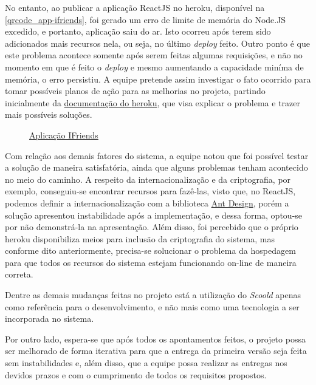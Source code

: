  No entanto, ao publicar a aplicação ReactJS no \gls{heroku}, disponível na \autoref{qrcode_app-ifriends}, foi gerado um erro de limite de memória do Node.JS excedido, e portanto, aplicação saiu do ar. Isto ocorreu após terem sido adicionados mais recursos nela, ou seja, no último \textsl{deploy} feito. Outro ponto é que este problema acontece somente após serem feitas algumas requisições, e não no momento em que é feito o \textsl{deploy} e mesmo aumentando a capacidade miníma de memória, o erro persistiu. A equipe pretende assim investigar o fato ocorrido para tomar possíveis planos de ação para as melhorias no projeto, partindo inicialmente da \href{https://devcenter.heroku.com/articles/node-memory-use}{documentação do \gls{heroku}}, que visa explicar o problema e trazer mais possíveis soluções.
 
\begin{figure}[htb]
\centering
\caption{\href{https://app-ifriends.herokuapp.com}{Aplicação IFriends}}
\label{qrcode_app-ifriends}
\end{figure}
\FloatBarrier

Com relação aos demais fatores do sistema, a equipe notou que foi possível testar a solução de maneira satisfatória, ainda que alguns problemas tenham acontecido no meio do caminho. A respeito da internacionalização e da criptografia, por exemplo, conseguiu-se encontrar recursos para fazê-las, visto que, no ReactJS, podemos definir a internacionalização com a biblioteca \href{https://ant.design/components/config-provider/}{Ant Design}, porém a solução apresentou instabilidade após a implementação, e dessa forma, optou-se por não demonstrá-la na apresentação. Além disso, foi percebido que o próprio \gls{heroku} disponibiliza meios para inclusão da criptografia do sistema, mas conforme dito anteriormente, precisa-se solucionar o problema da hospedagem para que todos os recursos do sistema estejam funcionando on-line de maneira correta.

Dentre as demais mudanças feitas no projeto está a utilização do \textsl{Scoold} apenas como referência para o desenvolvimento, e não mais como uma tecnologia a ser incorporada no sistema. 

Por outro lado, espera-se que após todos os apontamentos feitos, o projeto possa ser melhorado de forma iterativa para que a entrega da primeira versão seja feita sem instabilidades e, além disso, que a equipe possa realizar as entregas nos devidos prazos e com o cumprimento de todos os requisitos propostos.
